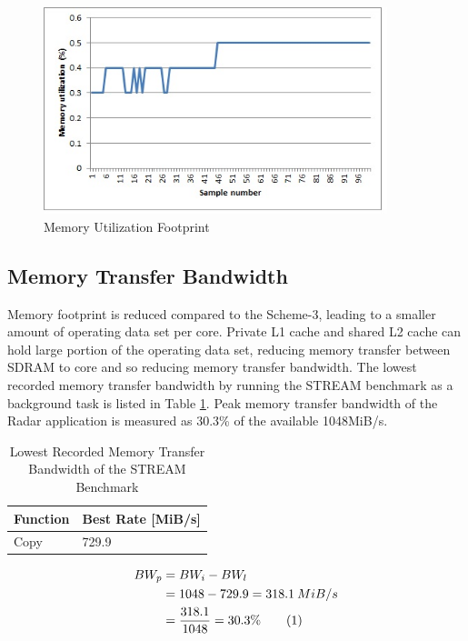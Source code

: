 \begin{figure}[h!]
	\centering
	\includegraphics[width=100mm]{figures/scheme5_mem_util}
	\caption{Memory Utilization Footprint}
	\label{fig:mm:scheme5_mem_util}
\end{figure}


\subsection{Memory Transfer Bandwidth}
\label{ss:mm:scheme5:bw_util}
Memory footprint is reduced compared to the Scheme-3, leading to a smaller amount of operating data set per core. Private L1 cache and shared L2 cache can hold large portion of the operating data set, reducing memory transfer between SDRAM to core and so reducing memory transfer bandwidth. The lowest recorded memory transfer bandwidth by running the STREAM benchmark as a background task is listed in Table \ref{tbl:mm:scheme5_mem_bw}. Peak memory transfer bandwidth of the Radar application is measured as 30.3\% of the available 1048MiB/s.

\begin{table}[h!]
	\centering
	\begin{tabular}{|l|l|} 
	 \hline
	 \textbf{Function} & \textbf{Best Rate [MiB/s]} \\
	 \hline
	 Copy & 729.9 \\ \hline
	\end{tabular}
	\caption{Lowest Recorded Memory Transfer Bandwidth of the STREAM Benchmark}
	\label{tbl:mm:scheme5_mem_bw}
\end{table}

\begin{align*}
\label{aa:scheme4:mem_bw}
	BW_{p} &= BW_{i} - BW_{l} \\
	&= 1048 - 729.9 =  318.1 \: MiB/s \\
	&= \frac{318.1}{1048} = 30.3 \% \stepcounter{equation}\tag{\theequation} 
\end{align*}

